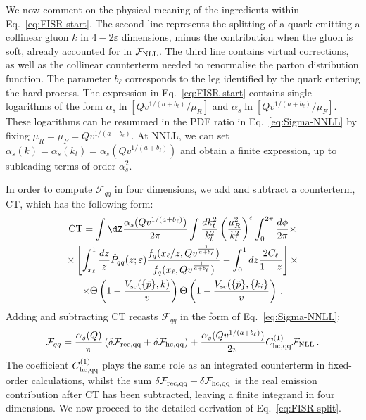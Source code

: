 We now comment on the physical meaning of the ingredients within Eq.~\eqref{eq:FISR-start}.
The second line represents the splitting of a
quark emitting a collinear gluon $k$ in $4-2\varepsilon$ dimensions,
minus the contribution when the gluon is soft, already accounted for
in $\mathcal{F}_{\rm NLL}$. The third line contains virtual
corrections, as well as the collinear counterterm needed to renormalise
the parton distribution function. The parameter $b_\ell$ corresponds
to the leg identified by the quark entering the hard process.  The
expression in Eq.~\eqref{eq:FISR-start} contains single logarithms of
the form $\alpha_s\ln[Qv^{1/(a+b_\ell)}/\mu_R]$ and
$\alpha_s\ln[Qv^{1/(a+b_\ell)}/\mu_F]$. These logarithms can be
resummed in the PDF ratio in Eq.~\eqref{eq:Sigma-NNLL}
by fixing $\mu_R=\mu_F=Qv^{1/(a+b_\ell)}$.
At NNLL, we can set
$\alpha_s(k)=\alpha_s(k_t)=\alpha_s(Qv^{1/(a+b_\ell)})$ and obtain a
finite expression, up to subleading terms of order $\alpha_s^2$.

In order to compute $\mathcal{F}_{qq}$ in four dimensions, we add and subtract
a counterterm, $\mathrm{CT}$, which has the following form:
\begin{multline}
    \mathrm{CT}=\int \dZ \frac{\alpha_s(Qv^{1/(a+b_\ell)})}{2\pi} \int\frac{dk_t^2}{k_t^2}\left(\frac{\mu_R^2}{k_t^2}\right)^{\varepsilon} \int_0^{2\pi}\frac{d\phi}{2\pi} \times \\
    \times \left[\int_{x_\ell}^1\frac{dz}{z}\hat P_{qq}(z;\varepsilon)\frac{f_q(x_\ell/z,Qv^{\frac{1}{a+b_\ell}})}{f_q(x_\ell,Qv^{\frac{1}{a+b_\ell}})}-\int_0^1dz\frac{2 C_\ell}{1-z}\right]\times \\ \times \Theta\left(1-\frac{V_{\mathrm{sc}}(\{\tilde{p}\},k)}{v}\right)\Theta\left(1-\frac{V_{\mathrm{sc}}(\{\tilde{p}\},\{k_i\}}{v}\right)\,.
  \end{multline}
  Adding and subtracting $\mathrm{CT}$ recasts $\mathcal{F}_{qq}$ in
the form of Eq.~\eqref{eq:Sigma-NNLL}:
\begin{equation}
  \label{eq:FISR-split}
  \mathcal{F}_{qq} = \frac{\alpha_s(Q)}{\pi}\left( \delta \mathcal{F}_{\rm rec,qq}+\delta\mathcal{F}_{\rm hc,qq}\right)+ \frac{\alpha_s(Q v^{1/(a+b_\ell)})}{2\pi} C^{(1)}_{\rm hc,qq} \mathcal{F}_{\rm NLL}\,.
\end{equation}
The coefficient $C^{(1)}_{\rm hc,qq}$ plays the same role as an integrated counterterm in fixed-order calculations, 
 whilst the sum $\delta \mathcal{F}_{\rm rec,qq}+\delta\mathcal{F}_{\rm hc,qq}$ is the real emission contribution after $\mathrm{CT}$ has been
subtracted, leaving a finite integrand in four dimensions. We now proceed to the detailed derivation of Eq.~\eqref{eq:FISR-split}. 

